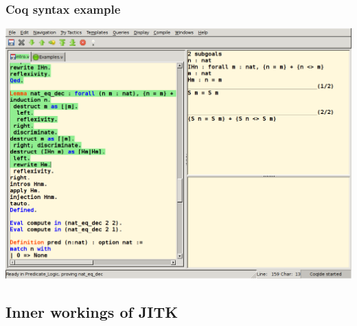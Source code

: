 \documentclass{beamer}
\begin{document}
\begin{frame}[shrink]\frametitle{Coq syntax example}
\includegraphics[scale=0.5]{CoqProof.png}
\end{frame}

\subsection{Inner workings of JITK}
\end{document}
